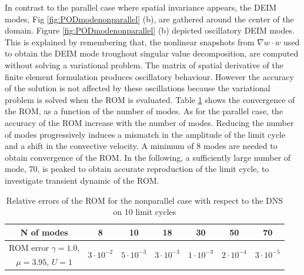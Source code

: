 \documentclass[11pt]{article}
\begin{document}
In contrast to the parallel case where spatial invariance appears, the DEIM modes, Fig \ref{fig:PODmodenonparallel} (b), are gathered around the center of the domain. Figure \ref{fig:PODmodenonparallel} (b) depicted oscillatory DEIM modes. This is explained by remembering that, the nonlinear snapshots from $\nabla w \cdot w$ used to obtain the DEIM mode troughout singular value decomposition, are computed without solving a variational problem. The matrix of spatial derivative of the finite element formulation produces oscillatory behaviour. However the accuracy of the solution is not affected by these oscillations because the variational problem is solved when the ROM is evaluated. Table \ref{tab:errorcyclenon} shows the convergence of the ROM, as a function of the number of modes. As for the parallel case, the accuracy of the ROM increase with the number of modes. Reducing the number of modes progressively induces a mismatch in the amplitude of the limit cycle and a shift in the convective velocity. A minimum of 8 modes are needed to obtain convergence of the ROM. In the following, a sufficiently large number of mode, 70, is peaked to obtain accurate reproduction of the limit cycle, to investigate transient dynamic of the ROM. 

\begin{table}[!ht]
\begin{center}
\begin{tabular}{ c || c | c | c | c | c |c|}
 N of modes &  8 & 10 & 18 & 30 & 50 &70\\ \hline
ROM error $\gamma=1.0$, &  \multirow{2}{*}{$3\cdot 10^{-2}$} & \multirow{2}{*}{$5\cdot 10^{-3}$} & \multirow{2}{*}{$3\cdot 10^{-3}$} & \multirow{2}{*}{$1\cdot 10^{-3}$}& \multirow{2}{*}{$2\cdot 10^{-4}$}& \multirow{2}{*}{$3\cdot 10^{-5}$}\\
 $\mu = 3.95$, $ U = 1$ & & & & && \\ \hline
\hline
\end{tabular}
\caption{Relative errors of the ROM for the nonparallel case with respect to the DNS on 10 limit cycles\label{tab:errorcyclenon}}
\end{center}
\end{table}
\end{document}
